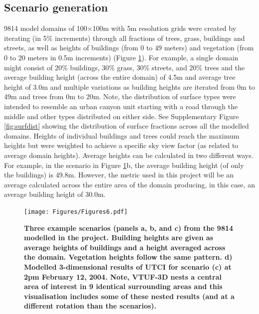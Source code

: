 \documentclass[final,3p,times,authoryear]{elsarticle}
\begin{document}
\subsection{Scenario generation}\label{sec:methodsgen}
9814 model domains of 100$\times$100m with 5m resolution grids were created by iterating (in 5\% increments) through all fractions of trees, grass, buildings and streets, as well as heights of buildings (from 0 to 49 meters) and vegetation (from 0 to 20 meters in 0.5m increments) (Figure \ref{fig:scenarios}). For example, a single domain might consist of 20\% buildings, 30\% grass, 30\% streets, and 20\% trees and the average building height (across the entire domain) of 4.5m and average tree height of 3.0m and multiple variations as building heights are iterated from 0m to 49m and trees from 0m to 20m. Note, the distribution of surface types were intended to resemble an urban canyon unit starting with a road through the middle and other types distributed on either side. See Supplementary Figure \ref{fig:surfdist} showing the distribution of surface fractions across all the modelled domains. Heights of individual buildings and trees could reach the maximum heights but were weighted to achieve a specific sky view factor (as related to average domain heights). Average heights can be calculated in two different ways. For example, in the scenario in Figure \ref{fig:scenarios}b, the average building height (of only the buildings) is 49.8m. However, the metric used in this project will be an average calculated across the entire area of the domain producing, in this case, an average building height of 30.0m.



\begin{figure}
\centering
\texttt{[image: Figures/Figures6.pdf]}
\caption{\bf Three example scenarios (panels a, b, and c) from the 9814 modelled in the project. Building heights are given as average heights of buildings and a height averaged across the domain. Vegetation heights follow the same pattern. d) Modelled 3-dimensional results of UTCI for scenario (c) at 2pm February 12, 2004. Note, VTUF-3D nests a central area of interest in 9 identical surrounding areas and this visualisation includes some of these nested results (and at a different rotation than the scenarios). }
 \label{fig:scenarios}
\end{figure} 
\end{document}
